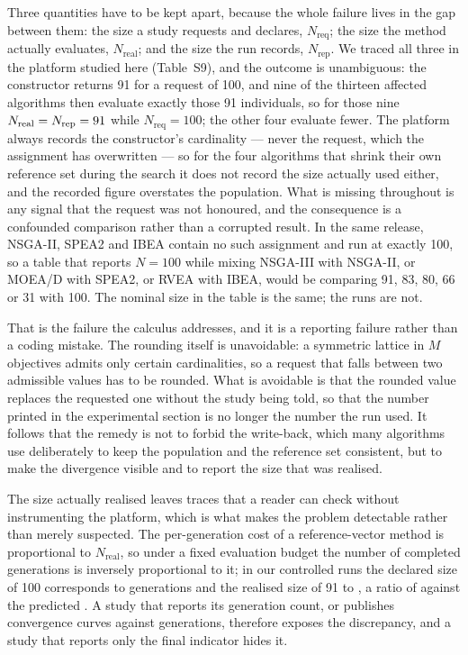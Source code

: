 \documentclass{SCIS2026}
\begin{document}
Three quantities have to be kept apart, because the whole failure lives in the gap between them: the size a study requests and declares, $N_{\mathrm{req}}$; the size the method actually evaluates, $N_{\mathrm{real}}$; and the size the run records, $N_{\mathrm{rep}}$. We traced all three in the platform studied here (Table~S9), and the outcome is unambiguous: the constructor returns 91 for a request of 100, and nine of the thirteen affected algorithms then evaluate exactly those 91 individuals, so for those nine $N_{\mathrm{real}} = N_{\mathrm{rep}} = 91{}$ while $N_{\mathrm{req}} = 100$; the other four evaluate fewer. The platform always records the constructor's cardinality --- never the request, which the assignment has overwritten --- so for the four algorithms that shrink their own reference set during the search it does not record the size actually used either, and the recorded figure overstates the population. What is missing throughout is any signal that the request was not honoured, and the consequence is a confounded comparison rather than a corrupted result. In the same release, NSGA-II, SPEA2 and IBEA contain no such assignment and run at exactly 100, so a table that reports $N=100$ while mixing NSGA-III with NSGA-II, or MOEA/D with SPEA2, or RVEA with IBEA, would be comparing 91, 83, 80, 66 or 31 with 100. The nominal size in the table is the same; the runs are not.

That is the failure the calculus addresses, and it is a reporting failure rather than a coding mistake. The rounding itself is unavoidable: a symmetric lattice in $M$ objectives admits only certain cardinalities, so a request that falls between two admissible values has to be rounded. What is avoidable is that the rounded value replaces the requested one without the study being told, so that the number printed in the experimental section is no longer the number the run used. It follows that the remedy is not to forbid the write-back, which many algorithms use deliberately to keep the population and the reference set consistent, but to make the divergence visible and to report the size that was realised.

The size actually realised leaves traces that a reader can check without instrumenting the platform, which is what makes the problem detectable rather than merely suspected. The per-generation cost of a reference-vector method is proportional to $N_{\mathrm{real}}$, so under a fixed evaluation budget the number of completed generations is inversely proportional to it; in our controlled runs the declared size of 100 corresponds to \genFix{} generations and the realised size of 91 to \genHost{}, a ratio of \genRatio{} against the predicted \popRatio{}. A study that reports its generation count, or publishes convergence curves against generations, therefore exposes the discrepancy, and a study that reports only the final indicator hides it.
\end{document}
